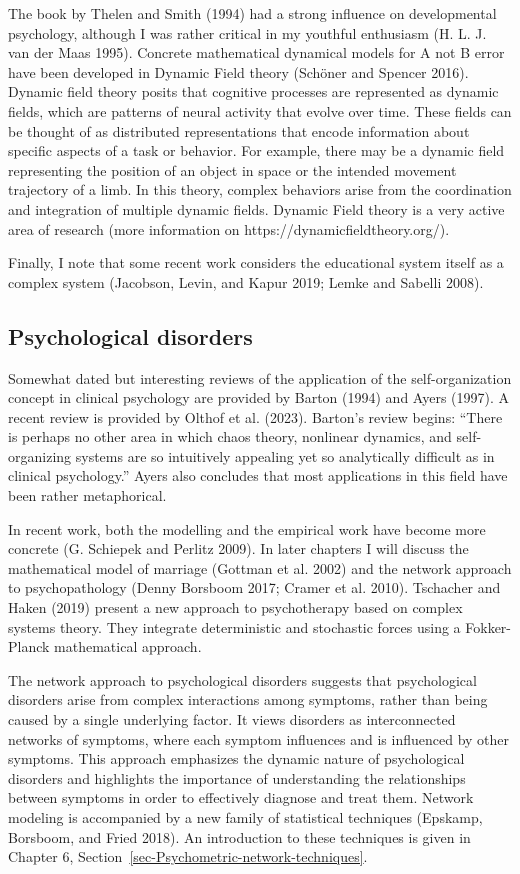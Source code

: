 \documentclass[
  a4paper,
  DIV=11,
  numbers=noendperiod,
  oneside]{scrreprt}
\begin{document}
The book by Thelen and Smith (1994) had a strong influence on
developmental psychology, although I was rather critical in my youthful
enthusiasm (H. L. J. van der Maas 1995). Concrete mathematical dynamical
models for A not B error have been developed in Dynamic Field theory
(Schöner and Spencer 2016). Dynamic field theory posits that cognitive
processes are represented as dynamic fields, which are patterns of
neural activity that evolve over time. These fields can be thought of as
distributed representations that encode information about specific
aspects of a task or behavior. For example, there may be a dynamic field
representing the position of an object in space or the intended movement
trajectory of a limb. In this theory, complex behaviors arise from the
coordination and integration of multiple dynamic fields. Dynamic Field
theory is a very active area of research (more information on
https://dynamicfieldtheory.org/).

Finally, I note that some recent work considers the educational system
itself as a complex system (Jacobson, Levin, and Kapur 2019; Lemke and
Sabelli 2008).

\hypertarget{sec-Psychological-disorders}{%
\subsection{Psychological disorders}\label{sec-Psychological-disorders}}

Somewhat dated but interesting reviews of the application of the
self-organization concept in clinical psychology are provided by Barton
(1994) and Ayers (1997). A recent review is provided by Olthof et al.
(2023). Barton's review begins: ``There is perhaps no other area in
which chaos theory, nonlinear dynamics, and self-organizing systems are
so intuitively appealing yet so analytically difficult as in clinical
psychology.'' Ayers also concludes that most applications in this field
have been rather metaphorical.

In recent work, both the modelling and the empirical work have become
more concrete (G. Schiepek and Perlitz 2009). In later chapters I will
discuss the mathematical model of marriage (Gottman et al. 2002) and the
network approach to psychopathology (Denny Borsboom 2017; Cramer et al.
2010). Tschacher and Haken (2019) present a new approach to
psychotherapy based on complex systems theory. They integrate
deterministic and stochastic forces using a Fokker-Planck mathematical
approach.

The network approach to psychological disorders suggests that
psychological disorders arise from complex interactions among symptoms,
rather than being caused by a single underlying factor. It views
disorders as interconnected networks of symptoms, where each symptom
influences and is influenced by other symptoms. This approach emphasizes
the dynamic nature of psychological disorders and highlights the
importance of understanding the relationships between symptoms in order
to effectively diagnose and treat them. Network modeling is accompanied
by a new family of statistical techniques (Epskamp, Borsboom, and Fried
2018). An introduction to these techniques is given in Chapter 6,
Section~\ref{sec-Psychometric-network-techniques}.
\end{document}

